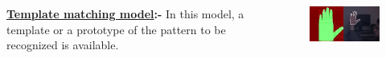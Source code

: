 \documentclass{beamer}
\begin{document}
\begin{frame}
\begin{itemize}
\begin{columns}
\begin{column}{.2\textwidth}
\begin{figure}
\end{figure}
\end{column}
\end{columns}

 \begin{columns}
\begin{column}{.7\textwidth}
\item {\bf \underline{ Template matching model}:-} In this model, a template or a prototype of the pattern to be recognized is available. \pause

\end{column}
 \begin{column}{.2\textwidth}
\begin{figure}
\includegraphics[width=\textwidth]{tem.jpg} \pause

\end{figure}
\end{column}
\end{columns}


\end{itemize}
\end{frame}
\end{document}
